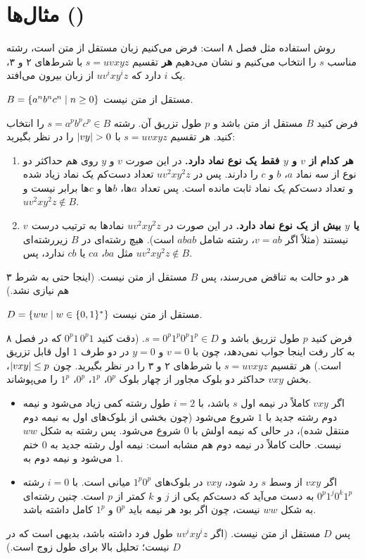 \section{مثال‌ها ()}

روش استفاده مثل فصل ۸ است: فرض می‌کنیم زبان مستقل از متن است، رشته مناسب $s$ را انتخاب می‌کنیم و نشان می‌دهیم \textbf{هر} تقسیم $s=uvxyz$ با شرط‌های ۲ و ۳، یک $i$ دارد که $uv^ixy^iz$ از زبان بیرون می‌افتد.

\begin{example}[$a^nb^nc^n$]\label{ex:anbncn}
$B=\{a^nb^nc^n\mid n\ge0\}$ مستقل از متن نیست.

فرض کنید $B$ مستقل از متن باشد و $p$ طول تزریق آن. رشته $s=a^pb^pc^p\in B$ را انتخاب کنید. هر تقسیم $s=uvxyz$ با $\lvert vy\rvert>0$ را در نظر بگیرید:
\begin{enumerate}
\item \textbf{هر کدام از $v$ و $y$ فقط یک نوع نماد دارد.} در این صورت $v$ و $y$ روی هم حداکثر دو نوع از سه نماد $a$، $b$ و $c$ را دارند. پس در $uv^2xy^2z$ تعداد دست‌کم یک نماد زیاد شده و تعداد دست‌کم یک نماد ثابت مانده است. پس تعداد $a$ها، $b$ها و $c$ها برابر نیست و $uv^2xy^2z\notin B$.
\item \textbf{$v$ یا $y$ بیش از یک نوع نماد دارد.} در این صورت در $uv^2xy^2z$ نمادها به ترتیب درست نیستند (مثلاً اگر $v=ab$، رشته شامل $abab$ است). هیچ رشته‌ای در $B$ زیررشته‌ای مثل $ba$، $ca$ یا $cb$ ندارد، پس $uv^2xy^2z\notin B$.
\end{enumerate}
هر دو حالت به تناقض می‌رسند، پس $B$ مستقل از متن نیست. (اینجا حتی به شرط ۳ هم نیازی نشد.)
\end{example}

\begin{example}
$D=\{ww\mid w\in\{0,1\}^*\}$ مستقل از متن نیست.

فرض کنید $p$ طول تزریق باشد و $s=0^p1^p0^p1^p\in D$. (دقت کنید $0^p1\,0^p1$ که در فصل ۸ به کار رفت اینجا جواب نمی‌دهد، چون با $v=0$ و $y=0$ در دو طرف $1$ اول قابل تزریق است.) هر تقسیم $s=uvxyz$ با شرط‌های ۲ و ۳ را در نظر بگیرید. چون $\lvert vxy\rvert\le p$، بخش $vxy$ حداکثر دو بلوک مجاور از چهار بلوک $0^p$، $1^p$، $0^p$، $1^p$ را می‌پوشاند.
\begin{itemize}
\item اگر $vxy$ کاملاً در نیمه اول $s$ باشد، با $i=2$ طول رشته کمی زیاد می‌شود و نیمه دوم رشته جدید با $1$ شروع می‌شود (چون بخشی از بلوک‌های اول به نیمه دوم منتقل شده)، در حالی که نیمه اولش با $0$ شروع می‌شود. پس رشته به شکل $ww$ نیست. حالت کاملاً در نیمه دوم هم مشابه است: نیمه اول رشته جدید به $0$ ختم می‌شود و نیمه دوم به $1$.
\item اگر $vxy$ از وسط $s$ رد شود، $vxy$ در بلوک‌های $1^p0^p$ میانی است. با $i=0$ رشته $0^p1^j0^k1^p$ به دست می‌آید که دست‌کم یکی از $j$ و $k$ کمتر از $p$ است. چنین رشته‌ای به شکل $ww$ نیست، چون اگر بود هر نیمه باید $0^p$ و $1^p$ کامل داشته باشد.
\end{itemize}
پس $D$ مستقل از متن نیست. (اگر $uv^ixy^iz$ طول فرد داشته باشد، بدیهی است که در $D$ نیست؛ تحلیل بالا برای طول زوج است.)
\end{example}

